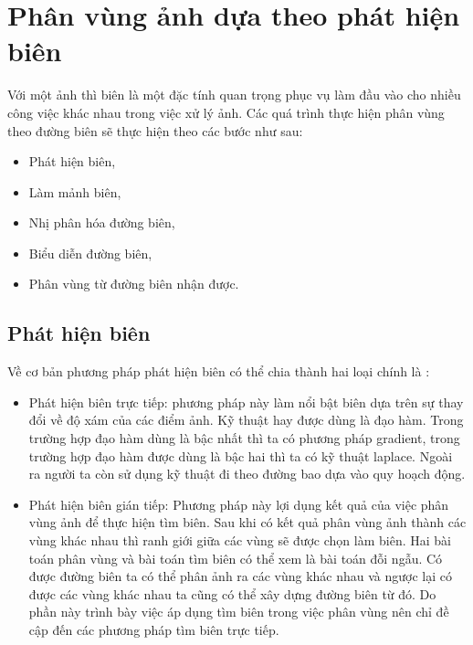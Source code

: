 \documentclass[12pt, oneside, a4paper]{book}
\begin{document}
\section{Phân vùng ảnh dựa theo phát hiện biên}
Với một ảnh thì biên là một đặc tính quan trọng phục vụ làm đầu vào cho nhiều công việc khác nhau trong việc xử lý ảnh. 
Các quá trình thực hiện phân vùng theo đường biên sẽ thực hiện theo các bước như sau:
\begin{itemize}
\item Phát hiện biên,
\item Làm mảnh biên,
\item Nhị phân hóa đường biên,
\item Biểu diễn đường biên,
\item Phân vùng từ đường biên nhận được.
\end{itemize}
\subsection{Phát hiện biên }
Về cơ bản phương pháp phát hiện biên có thể chia thành hai loại chính là :
\begin{itemize}
\item Phát hiện biên trực tiếp: phương pháp này làm nổi bật biên dựa trên sự thay đổi về độ xám của các điểm ảnh. Kỹ thuật hay được dùng là đạo hàm. Trong trường hợp đạo hàm dùng là bậc nhất thì ta có phương pháp gradient, trong trường hợp đạo hàm được dùng là bậc hai thì ta có kỹ thuật laplace. Ngoài ra người ta còn sử dụng kỹ thuật đi theo đường bao dựa vào quy hoạch động.
\item Phát hiện biên gián tiếp:  Phương pháp này lợi dụng kết quả của việc phân vùng ảnh để thực hiện tìm biên. Sau khi có kết quả phân vùng ảnh thành các vùng khác nhau thì ranh giới giữa các vùng sẽ được chọn làm biên. Hai bài toán phân vùng  và bài toán tìm biên có thể xem là bài toán đỗi ngẫu. Có được đường biên ta có thể phân ảnh ra các vùng khác nhau và ngược lại có được các vùng khác nhau ta cũng có thể xây dựng đường biên từ đó. Do phần này trình bày việc áp dụng tìm biên trong việc phân vùng nên chỉ đề cập đến các phương pháp tìm biên trực tiếp.
\end{itemize}
\end{document}

